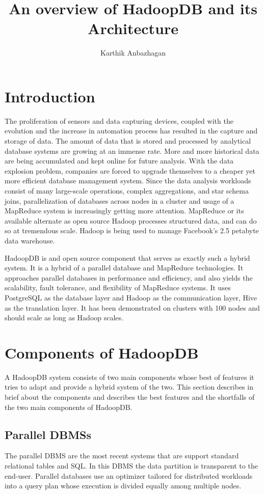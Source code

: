 \documentclass[9pt,twocolumn,twoside]{../../styles/osajnl}
\title{An overview of HadoopDB and its Architecture}
\author[1]{Karthik Anbazhagan}
\affil[1]{School of Informatics and Computing, Bloomington, IN 47408, U.S.A.}
\affil[*]{Corresponding authors: kartanba@iu.edu}
\begin{document}
\maketitle 


\section{Introduction}
The proliferation of sensors and data capturing devices, coupled with the evolution and the increase in automation process has resulted in the capture and storage of data. The amount of data that is stored and processed by analytical database systems are growing at an immense rate. More and more historical data are being accumulated and kept online for future analysis. With the data explosion problem, companies are forced to upgrade themselves to a cheaper yet more efficient database management system. Since the data analysis workloads consist of many large-scale operations, complex aggregations, and star schema joins, parallelization of databases across nodes in a cluster and usage of a MapReduce system is increasingly getting more attention. MapReduce or its available alternate as open source Hadoop processes structured data, and can do so at tremendous scale. Hadoop is being used to manage Facebook’s 2.5 petabyte data warehouse. 

HadoopDB\cite{hadoopdb} is and open source component that serves as exactly such a hybrid system. It is a hybrid of a parallel database and MapReduce technologies. It approaches parallel databases in performance and efficiency, and also yields the scalability, fault tolerance, and flexibility of MapReduce systems. It uses PostgreSQL as the database layer and Hadoop as the communication layer, Hive as the translation layer. It has been demonstrated on clusters with 100 nodes and should scale as long as Hadoop scales. 

\section{Components of HadoopDB}
A HadoopDB \cite{hadoopdb-project} system consists of two main components whose best of features it tries to adapt and provide a hybrid system of the two. This section describes in brief about the components and describes the best features and the shortfalls of the two main components of HadoopDB.

\subsection{Parallel DBMSs}
The parallel DBMS are the most recent systems that are support standard relational tables and SQL. In this DBMS the data partition is transparent to the end-user. Parallel databases use an optimizer tailored for distributed workloads into a query plan whose execution is divided equally among multiple nodes.
 
\end{document}
